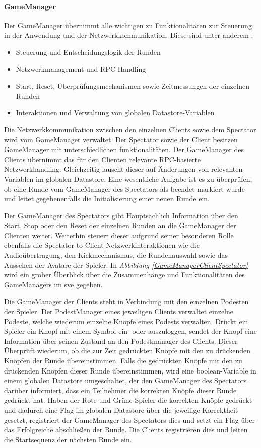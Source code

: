 \documentclass[a4paper,11pt]{article}%
\renewcommand{\\}{\vspace*{0.5\baselineskip} \newline}
\begin{document}
\paragraph{GameManager}
Der GameManager übernimmt alle wichtigen zu Funktionalitäten zur Steuerung in der Anwendung und der Netzwerkkommunikation.
Diese sind unter anderem :
\begin{itemize}[itemsep=0cm]
\item Steuerung und Entscheidungslogik der Runden
\item Netzwerkmanagement und RPC Handling
\item Start, Reset, Überprüfungsmechanismen sowie Zeitmessungen der einzelnen Runden
\item Interaktionen und Verwaltung von globalen Datastore-Variablen
\end{itemize}

Die Netzwerkkommunikation zwischen den einzelnen Clients sowie dem Spectator wird vom GameManager verwaltet. Der Spectator sowie der Client besitzen GameManager mit unterschiedlichen funktionalitäten.
Der GameManager des Clients übernimmt das für den Clienten relevante RPC-basierte Netzwerkhandling. Gleichzeitig lauscht dieser auf Änderungen von relevanten Variablen im globalen Datastore.
Eine wesentliche Aufgabe ist es zu überprüfen, ob eine Runde vom GameManager des Spectators als beendet markiert wurde und leitet gegebenenfalls die Initialisierung einer neuen Runde ein.

Der GameManager des Spectators gibt Hauptsächlich  Information über den Start, Stop oder den Reset der einzelnen Runden an die GameManager der Clienten weiter. Weiterhin steuert dieser aufgrund seiner besonderen Rolle ebenfalls die Spectator-to-Client Netzwerkinteraktionen wie die Audioübertragung, den Kickmechanismus, die Rundenauswahl sowie das Aussehen der Avatare der Spieler.
In \textit{Abbildung \ref{GameManagerClientSpectator}} wird ein grober Überblick über die Zusammenhänge und Funktionalitäten des GameManagers im \ac{sve} gegeben.

Die GameManager der Clients steht in Verbindung mit den einzelnen Podesten der Spieler. Der PodestManager eines jeweiligen Clients verwaltet einzelne Podeste, welche wiederum  einzelne Knöpfe eines Podests verwalten. 
Drückt ein Spieler ein Knopf mit einem Symbol ein- oder auszuloggen, sendet der Knopf eine Information über seinen Zustand an den Podestmanager des Clients. Dieser Überprüft wiederum, ob die zur Zeit gedrückten Knöpfe mit den zu drückenden Knöpfen der Runde übereinstimmen. Falls die gedrückten Knöpfe mit den zu drückenden Knöpfen dieser Runde übereinstimmen, wird eine boolean-Variable in einem globalen Datastore umgeschaltet, der den GameManager des Spectators darüber informiert, dass ein Teilnehmer die korrekten Knöpfe dieser Runde gedrückt hat. Haben der \dq{}Rote und Grüne\dq{} Spieler die korrekten Knöpfe gedrückt und dadurch eine Flag im globalen Datastore über die jeweilige Korrektheit gesetzt, registriert der GameManager des Spectators dies und setzt ein Flag über das Erfolgreiche abschließen der Runde. Die Clients registrieren dies und leiten die Startsequenz der nächsten Runde ein. 
\end{document}
